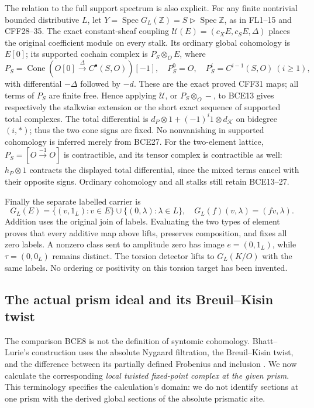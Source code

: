 The relation to the full support spectrum is also explicit.
For any finite nontrivial bounded distributive \(L\), let
\(Y=\operatorname{Spec}G_L(\mathbb Z)=S\triangleright
\operatorname{Spec}\mathbb Z\), as in FL1--15 and CFF28--35.
The exact constant-sheaf coupling
\(\mathcal U(E)=(c_XE,c_SE,\Delta)\) places the original
coefficient module on every stalk. Its ordinary global
cohomology is \(E[0]\); its supported cochain complex is
\(P_S\otimes_OE\), where
\[
P_S=\operatorname{Cone}(O[0]\xrightarrow{\Delta}C^\bullet(S,O))[-1],
\quad P_S^0=O,\quad P_S^i=C^{i-1}(S,O)\ (i\ge1),
\]
with differential \(-\Delta\) followed by \(-d\).
These are the exact proved CFF31 maps; all terms of \(P_S\)
are finite free. Hence applying \(\mathcal U\), or
\(P_S\otimes_O-\), to BCE13 gives respectively the stalkwise
extension or the short exact sequence of supported total
complexes. The total differential is
\(d_P\otimes1+(-1)^i1\otimes d_{\mathcal K}\) on bidegree
\((i,*)\); thus the two cone signs are fixed.
No nonvanishing in supported cohomology is inferred merely
from BCE27. For the two-element lattice,
\(P_S=[O\xrightarrow{-1}O]\) is contractible, and its tensor
complex is contractible as well: \(h_P\otimes1\) contracts
the displayed total differential, since the mixed terms
cancel with their opposite signs. Ordinary cohomology and
all stalks still retain BCE13--27.

Finally the separate labelled carrier is
\begin{equation}\tag{BCE28}
G_L(E)=\{(v,1_L):v\in E\}\cup\{(0,\lambda):\lambda\in L\},
\quad G_L(f)(v,\lambda)=(fv,\lambda).
\end{equation}
Addition uses the original join of labels. Evaluating the two
types of element proves that every additive map above lifts,
preserves composition, and fixes all zero labels. A nonzero
class sent to amplitude zero has image \(e=(0,1_L)\), while
\(\tau=(0,0_L)\) remains distinct. The torsion detector lifts
to \(G_L(K/O)\) with the same labels. No ordering or positivity
on this torsion target has been invented.

\subsection{The actual prism ideal and its Breuil--Kisin twist}

The comparison BCE8 is not the definition of syntomic cohomology.
Bhatt--Lurie's construction uses the absolute Nygaard filtration,
the Breuil--Kisin twist, and the difference between its partially
defined Frobenius and inclusion \cite{BL}. We now calculate the
corresponding \emph{local twisted fixed-point complex at the given
prism}. This terminology specifies the calculation's domain:
we do not identify sections at one prism with the derived global
sections of the absolute prismatic site.

